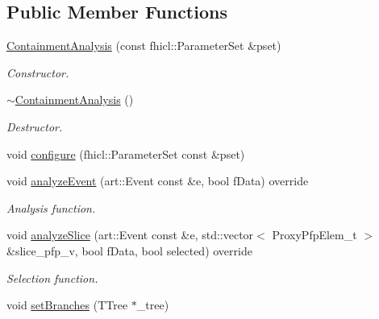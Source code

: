 \subsection*{Public Member Functions}
\begin{DoxyCompactItemize}
\item 
\hyperlink{classanalysis_1_1ContainmentAnalysis_a1544702632da81fbf99462a4099ad15e}{Containment\-Analysis} (const fhicl\-::\-Parameter\-Set \&pset)
\begin{DoxyCompactList}\small\item\em Constructor. \end{DoxyCompactList}\item 
\hypertarget{classanalysis_1_1ContainmentAnalysis_ae5f996c6ad46bc60af73f632eb3b44ae}{\hyperlink{classanalysis_1_1ContainmentAnalysis_ae5f996c6ad46bc60af73f632eb3b44ae}{$\sim$\-Containment\-Analysis} ()}\label{classanalysis_1_1ContainmentAnalysis_ae5f996c6ad46bc60af73f632eb3b44ae}

\begin{DoxyCompactList}\small\item\em Destructor. \end{DoxyCompactList}\item 
void \hyperlink{classanalysis_1_1ContainmentAnalysis_a0ea0287e139776b12c996ca624e8e8eb}{configure} (fhicl\-::\-Parameter\-Set const \&pset)
\item 
\hypertarget{classanalysis_1_1ContainmentAnalysis_a5bcf033310f0e8f58fd6f4f46f216985}{void \hyperlink{classanalysis_1_1ContainmentAnalysis_a5bcf033310f0e8f58fd6f4f46f216985}{analyze\-Event} (art\-::\-Event const \&e, bool f\-Data) override}\label{classanalysis_1_1ContainmentAnalysis_a5bcf033310f0e8f58fd6f4f46f216985}

\begin{DoxyCompactList}\small\item\em Analysis function. \end{DoxyCompactList}\item 
void \hyperlink{classanalysis_1_1ContainmentAnalysis_a6e3c839d18ff3001b46be5fde80a5d04}{analyze\-Slice} (art\-::\-Event const \&e, std\-::vector$<$ Proxy\-Pfp\-Elem\-\_\-t $>$ \&slice\-\_\-pfp\-\_\-v, bool f\-Data, bool selected) override
\begin{DoxyCompactList}\small\item\em Selection function. \end{DoxyCompactList}\item 
\hypertarget{classanalysis_1_1ContainmentAnalysis_a4f8ad99a58baf6623cbeb4aa686939d0}{void \hyperlink{classanalysis_1_1ContainmentAnalysis_a4f8ad99a58baf6623cbeb4aa686939d0}{set\-Branches} (T\-Tree $\ast$\-\_\-tree)}\label{classanalysis_1_1ContainmentAnalysis_a4f8ad99a58baf6623cbeb4aa686939d0}


\end{DoxyCompactItemize}
